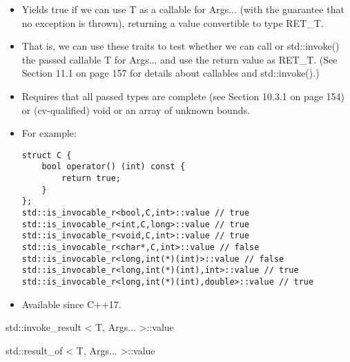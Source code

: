 \begin{itemize}
\item 
Yields true if we can use T as a callable for Args... (with the guarantee that no exception is thrown), returning a value convertible to type RET\_T.

\item 
That is, we can use these traits to test whether we can call or std::invoke() the passed callable T for Args... and use the return value as RET\_T. (See Section 11.1 on page 157 for details about callables and std::invoke().)

\item 
Requires that all passed types are complete (see Section 10.3.1 on page 154) or (cv-qualified) void or an array of unknown bounds.

\item 
For example:
\begin{lstlisting}[style=styleCXX]
struct C {
	bool operator() (int) const {
		return true;
	}
};
std::is_invocable_r<bool,C,int>::value // true
std::is_invocable_r<int,C,long>::value // true
std::is_invocable_r<void,C,int>::value // true
std::is_invocable_r<char*,C,int>::value // false
std::is_invocable_r<long,int(*)(int)>::value // false
std::is_invocable_r<long,int(*)(int),int>::value // true
std::is_invocable_r<long,int(*)(int),double>::value // true
\end{lstlisting}

\item 
Available since C++17.
\end{itemize}

std::invoke\_result < T, Args... >::value

std::result\_of < T, Args... >::value

